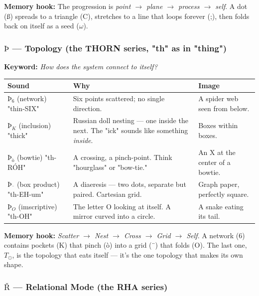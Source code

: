 \documentclass[12pt,a4paper]{article}
\begin{document}
\textbf{Memory hook:} The progression is \emph{point $\rightarrow$ plane $\rightarrow$ process $\rightarrow$ self}. A dot (ß) spreads to a triangle (C), stretches to a line that loops forever (;), then folds back on itself as a seed ($\omega$).

\subsubsection{$Þ$ --- Topology (the \textbf{THORN} series, "th" as in "thing")}

\textbf{Keyword:} \emph{How does the system connect to itself?}

\begin{table}[htbp]
\centering
\small
{}
\begin{tabularx}{\textwidth}{>{\centering\arraybackslash}X >{\centering\arraybackslash}X >{\centering\arraybackslash}X}
\toprule
\rowcolor{gray!25}\textbf{Sound} & \textbf{Why} & \textbf{Image} \\
\midrule
\rowcolors{1}{white}{gray!10}
\textbf{$Þ_{6}$} (network) "thin-SIX" & Six points scattered; no single direction. & A spider web seen from below. \\
\textbf{$Þ_{K}$} (inclusion) "thick" & Russian doll nesting --- one inside the next. The "ick" sounds like something \emph{inside}. & Boxes within boxes. \\
\textbf{$Þ_{\text{ò}}$} (bowtie) "th-RÓH" & A crossing, a pinch-point. Think "hourglass" or "bow-tie." & An X at the center of a bowtie. \\
\textbf{$Þ_{\text{¨}}$} (box product) "th-EH-um" & A diaeresis --- two dots, separate but paired. Cartesian grid. & Graph paper, perfectly square. \\
\textbf{$Þ_{O}$} (imscriptive) "th-OH" & The letter O looking at itself. A mirror curved into a circle. & A snake eating its tail. \\
\bottomrule
\end{tabularx}
\end{table}

\textbf{Memory hook:} \emph{Scatter $\rightarrow$ Nest $\rightarrow$ Cross $\rightarrow$ Grid $\rightarrow$ Self}. A network (6) contains pockets (K) that pinch (ò) into a grid (¨) that folds (O). The last one, $T_{\odot}$, is the topology that eats itself --- it's the one topology that makes its own shape.

\subsubsection{$Ř$ --- Relational Mode (the \textbf{RHA} series)}
\end{document}
